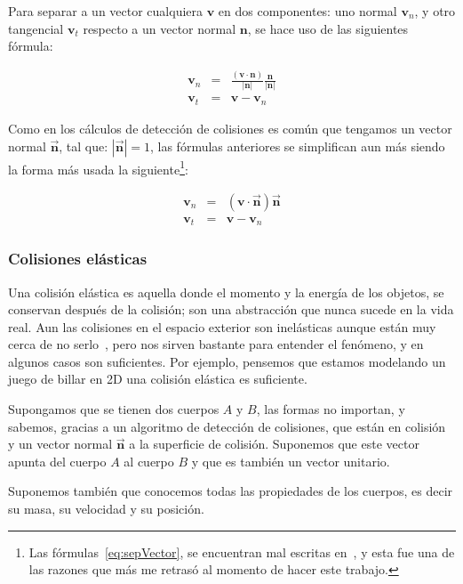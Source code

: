 Para separar a un vector cualquiera $\textbf{v}$ en dos componentes: uno normal $\textbf{v}_n$, y otro tangencial $\textbf{v}_t$ respecto a un vector normal $\textbf{n}$, se hace uso de las siguientes fórmula:

\begin{eqnarray}
\textbf{v}_n & = &\frac{(\textbf{v} \cdot \textbf{n})}{|\textbf{n}|} \frac{\textbf{n}}{|\textbf{n}|} \nonumber \\
\textbf{v}_t & = & \textbf{v} - \textbf{v}_n \nonumber
\end{eqnarray}

Como en los cálculos de detección de colisiones es común que tengamos un vector normal $\vec{\textbf{n}}$, tal que: $|\vec{\textbf{n}}| = 1$, las fórmulas anteriores se simplifican aun más siendo la forma más usada la siguiente\footnote{Las fórmulas~\eqref{eq:sepVector}, se encuentran mal escritas en~\cite{BaraffWitkin:Coursenotes}, y esta fue una de las razones que más me retrasó al momento de hacer este trabajo.}:

\begin{eqnarray}
\textbf{v}_n & = &(\textbf{v} \cdot \vec{\textbf{n}}) \vec{\textbf{n}} \nonumber \\
\textbf{v}_t & = & \textbf{v} - \textbf{v}_n
\label{eq:sepVector} 
\end{eqnarray}

\subsubsection{Colisiones elásticas}

Una colisión elástica es aquella donde el momento y la energía de los objetos, se conservan después de la colisión; son una abstracción que nunca sucede en la vida real.
Aun las colisiones en el espacio exterior son inelásticas aunque están muy cerca de no serlo~\cite{FisicaMatematicasVideojuegos}, pero nos sirven bastante para entender el fenómeno, y en algunos casos son suficientes.
Por ejemplo, pensemos que estamos modelando un juego de billar en 2D una colisión elástica es suficiente.

Supongamos que se tienen dos cuerpos $A$ y $B$, las formas no importan, y sabemos, gracias a un algoritmo de detección de colisiones, que están en colisión y un vector normal $\vec{\textbf{n}}$ a la superficie de colisión.
Suponemos que este vector apunta del cuerpo $A$ al cuerpo $B$ y que es también un vector unitario.

Suponemos también que conocemos todas las propiedades de los cuerpos, es decir su masa, su velocidad y su posición.

